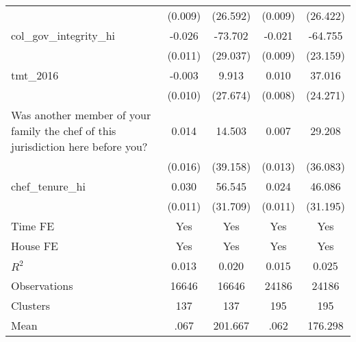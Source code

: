 {\begin{tabular}{l*{4}{c}}
                &  (0.009)         & (26.592)         &  (0.009)         & (26.422)         \\
col\_gov\_integrity\_hi&   -0.026\sym{**} &  -73.702\sym{**} &   -0.021\sym{**} &  -64.755\sym{***}\\
                &  (0.011)         & (29.037)         &  (0.009)         & (23.159)         \\
tmt\_2016        &   -0.003         &    9.913         &    0.010         &   37.016         \\
                &  (0.010)         & (27.674)         &  (0.008)         & (24.271)         \\
Was another member of your family the chef of this jurisdiction here before you?&    0.014         &   14.503         &    0.007         &   29.208         \\
                &  (0.016)         & (39.158)         &  (0.013)         & (36.083)         \\
chef\_tenure\_hi  &    0.030\sym{***}&   56.545\sym{*}  &    0.024\sym{**} &   46.086         \\
                &  (0.011)         & (31.709)         &  (0.011)         & (31.195)         \\
Time FE         &      Yes         &      Yes         &      Yes         &      Yes         \\
House FE        &      Yes         &      Yes         &      Yes         &      Yes         \\
\hline
\(R^{2}\)       &    0.013         &    0.020         &    0.015         &    0.025         \\
Observations    &    16646         &    16646         &    24186         &    24186         \\
Clusters        &      137         &      137         &      195         &      195         \\
Mean            &     .067         &  201.667         &     .062         &  176.298         \\
\hline\hline
\end{tabular}
}
